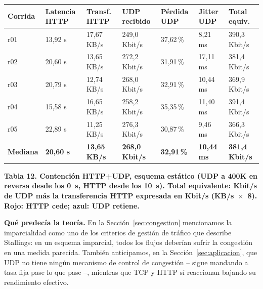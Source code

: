 \documentclass[11pt,a4paper]{article}
\newcommand{\figcaption}[1]{\par\noindent\footnotesize\textbf{#1}\par\vspace{0.4cm}}
\begin{document}
\needspace{1cm}
\begin{center}
\begin{minipage}{0.96\linewidth}
\centering
\scriptsize
\setlength{\tabcolsep}{3pt}
\begin{tabular}{@{}p{1.4cm}p{1.9cm}p{2cm}p{2cm}p{1.9cm}p{1.9cm}p{2cm}@{}}
\toprule
\textbf{Corrida} & \textbf{Latencia HTTP} & \textbf{Transf. HTTP} & \textbf{UDP recibido} & \textbf{P\'erdida UDP} & \textbf{Jitter UDP} & \textbf{Total equiv.} \\
\midrule
r01 & \cellcolor{red!20}13,92 s & \cellcolor{red!20}17,67 KB/s & \cellcolor{blue!15}249,0 Kbit/s & 37,62\,\% & 8,21 ms & 390,3 Kbit/s \\
r02 & \cellcolor{red!20}20,60 s & \cellcolor{red!20}13,65 KB/s & \cellcolor{blue!15}272,2 Kbit/s & 31,91\,\% & 17,11 ms & 381,4 Kbit/s \\
r03 & \cellcolor{red!20}20,79 s & \cellcolor{red!20}12,74 KB/s & \cellcolor{blue!15}268,0 Kbit/s & 32,91\,\% & 10,44 ms & 369,9 Kbit/s \\
r04 & \cellcolor{red!20}15,58 s & \cellcolor{red!20}16,65 KB/s & \cellcolor{blue!15}258,2 Kbit/s & 35,35\,\% & 11,40 ms & 391,4 Kbit/s \\
r05 & \cellcolor{red!20}22,89 s & \cellcolor{red!20}11,25 KB/s & \cellcolor{blue!15}276,3 Kbit/s & 30,87\,\% & 9,46 ms & 366,3 Kbit/s \\
\midrule
\textbf{Mediana} & \cellcolor{red!20}\textbf{20,60 s} & \cellcolor{red!20}\textbf{13,65 KB/s} & \cellcolor{blue!15}\textbf{268,0 Kbit/s} & \textbf{32,91\,\%} & \textbf{10,44 ms} & \textbf{381,4 Kbit/s} \\
\bottomrule
\end{tabular}
\par\vspace{0.1cm}
\figcaption{Tabla 12. Contenci\'on HTTP+UDP, esquema est\'atico (UDP a 400K en reversa desde los 0~s, HTTP desde los 10~s). Total equivalente: Kbit/s de UDP m\'as la transferencia HTTP expresada en Kbit/s (KB/s~$\times$~8). Rojo: HTTP cede; azul: UDP retiene.}
\end{minipage}
\end{center}

\textbf{Qu\'e predec\'ia la teor\'ia.} En la Secci\'on~\ref{sec:congestion} mencionamos la imparcialidad como uno de los criterios de gesti\'on de tr\'afico que describe Stallings: en un esquema imparcial, todos los flujos deber\'ian sufrir la congesti\'on en una medida parecida. Tambi\'en anticipamos, en la Secci\'on~\ref{sec:aplicacion}, que UDP no tiene ning\'un mecanismo de control de congesti\'on -- sigue mandando a tasa fija pase lo que pase --, mientras que TCP y HTTP s\'i reaccionan bajando su rendimiento efectivo.
\end{document}
